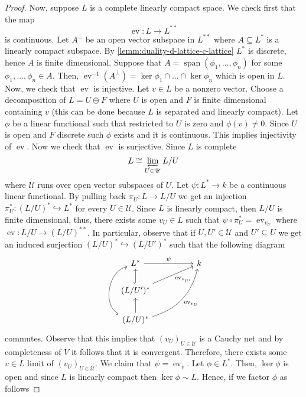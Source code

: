\begin{proof}
	Now, suppose $L$ is a complete linearly compact space. We check first that the map 
	\[
		\operatorname{ev}\colon L \to L^{**}
	\]
	is continuous. Let $A^{\perp}$ be an open vector subspace in $L^{**}$ where $A \subseteq L^{*}$ is a linearly compact subspace. By \cref{lemm:duality-d-lattice-c-lattice} $L^{*}$ is discrete, hence $A$ is finite dimensional. Suppose that $A = \operatorname{span}(\phi_{1},\ldots,\phi_{n})$ for some $\phi_{1},\ldots,\phi_{n} \in A$. Then, $\operatorname{ev}^{-1}(A^{\perp}) = \ker \phi_{1} \cap \ldots \cap \ker \phi_{n}$ which is open in $L$. Now, we check that $\operatorname{ev}$ is injective. Let $v \in L$ be a nonzero vector. Choose a decomposition of $L = U \oplus F$ where $U$ is open and $F$ is finite dimensional containing $v$ (this can be done because $L$ is separated and linearly compact). Let $\phi$ be a linear functional such that restricted to $U$ is zero and $\phi(v) \neq 0$. Since $U$ is open and $F$ discrete such $\phi$ exists and it is continuous. This implies injectivity of $\operatorname{ev}$.  Now we check that $\operatorname{ev}$ is surjective. Since $L$ is complete 
	\[
		L \cong \varprojlim_{U \in \mathscr{U}} L/U
	\]
	where $\mathscr{U}$ runs over open vector subspaces of $U$. Let $\psi\colon L^{*} \to k$ be a continuous linear functional. By pulling back $\pi_{U}\colon L \to L/U$ we get an injection $\pi_{U}^{*}\colon(L/U)^{*} \hookrightarrow L^{*}$ for every $U \in \mathscr{U}$. Since $L$ is linearly compact, then $L/U$ is finite dimensional, thus, there exists some $v_{U}\in L$ such that $\psi \circ \pi_{U}^{*} = \operatorname{ev}_{v_{U}}$ where $\operatorname{ev}\colon L/U \to (L/U)^{**}$. In particular, observe that if $U,U' \in \mathscr{U}$ and $U' \subseteq U$ we get an induced surjection $(L/U)^{*} \hookrightarrow (L/U')^{*}$ such that the following diagram
	\[
	\begin{tikzcd}
		L^{*} \arrow[rr, "\psi"] & & k \\
		(L/U')^{*} \arrow[u, hook] \arrow[urr, swap, "\operatorname{ev}_{v_{U'}}"] & & \\
		(L/U)^{*} \arrow[u] \arrow[uurr, swap, bend right, "\operatorname{ev}_{v_{U}}"] \arrow[uu, bend left = 70, hook]& & 
	\end{tikzcd}
	\]
	commutes. Observe that this implies that $(v_{U})_{U\in \mathscr{U}}$ is a Cauchy net and by completeness of $V$ it follows that it is convergent. Therefore, there exists some $v \in L$ limit of $(v_{U})_{U\in \mathscr{U}}$. We claim that $\psi = \operatorname{ev}_{v}$. Let $\phi \in L^{*}$. Then, $\ker\phi$ is open and since $L$ is linearly compact then $\ker\phi \sim L$. Hence, if we factor $\phi$ as follows

\end{proof}
